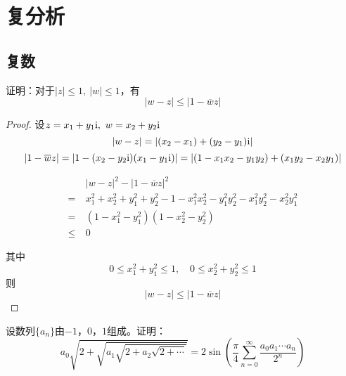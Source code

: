 \chapter{复分析}

\section{复数}

\begin{proposition}
    
    证明：对于$|z| \leq 1, \ |w| \leq 1$，有
    $$|w - z| \leq |1 - \overline{w}z|$$

\end{proposition}

\begin{proof}

    设$z = x_1 + y_1\mathrm{i},\ w = x_2 + y_2\mathrm{i}$
    $$|w - z| = | (x_2 - x_1) + (y_2 - y_1)\mathrm{i}| $$
    $$|1 - \overline{w}z| = |1 - (x_2 - y_2\mathrm{i}) (x_1 - y_1\mathrm{i})| = | (1 - x_1x_2 - y_1y_2) + (x_1y_2 - x_2y_1) |$$

    \begin{align*}
        &|w - z|^2 - |1 - \overline{w}z|^2 \\
        = \ & x_1^2 + x_2^2 + y_1^2 + y_2^2 - 1 - x_1^2x_2^2 -  y_1^2y_2^2 - x_1^2 y_2^2 -  x_2^2y_1^2 \\
        = \ & (1 - x_1^2 - y_1^2) (1 - x_2^2 - y_2^2) \\
        \leq \ & 0
    \end{align*}

    其中
    $$0 \leq x_1^2 + y_1^2 \leq 1, \quad 0 \leq x_2^2 + y_2^2 \leq 1$$
    则
    $$|w - z| \leq |1 - \overline{w}z|$$

\end{proof}

\begin{proposition}

    设数列$\{a_n\}$由$-1$，$0$，$1$组成。证明：
    $$a_0\sqrt{2 + \sqrt{a_1 \sqrt{2 + a_2\sqrt{2 + \cdots}}}} = 2 \sin{\left(\dfrac{\pi}{4} \sum\limits_{n = 0}^{\infty}{\dfrac{a_0 a_1 \cdots a_n}{2^n}}\right)}$$

\end{proposition}

